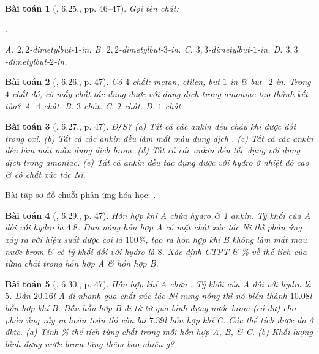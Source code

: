 \documentclass{article}
\newtheorem{baitoan}{Bài toán}
\begin{document}
\begin{baitoan}[\cite{SBT_Hoa_Hoc_11_co_ban}, 6.25., pp. 46--47]
	Gọi tên chất:
	\begin{center}
		.
	\end{center}
	{\sf A.} $2,2$-đimetylbut-$1$-in. {\sf B.} $2,2$-đimetylbut-$3$-in. {\sf C.} $3,3$-đimetylbut-$1$-in. {\sf D.} $3,3$-đimetylbut-$2$-in.
\end{baitoan}

\begin{baitoan}[\cite{SBT_Hoa_Hoc_11_co_ban}, 6.26., p. 47]
	Có $4$ chất: metan, etilen, but-$1$-in \& but$-2$-in. Trong $4$ chất đó, có mấy chất tác dụng được với dung dịch \emph{} trong amoniac tạo thành kết tủa? {\sf A.} $4$ chất. {\sf B.} $3$ chất. {\sf C.} $2$ chất. {\sf D.} $1$ chất.
\end{baitoan}

\begin{baitoan}[\cite{SBT_Hoa_Hoc_11_co_ban}, 6.27., p. 47]
	\emph{Đ\texttt{/}S?} (a) Tất cả các ankin đều cháy khi được đốt trong oxi. (b) Tất cả các ankin đều làm mất màu dung dịch \emph{}. (c) Tất cả các ankin đều làm mất màu dung dịch brom. (d) Tất cả các ankin đều tác dụng với dung dịch \emph{} trong amoniac. (e) Tất cả ankin đều tác dụng được với hydro ở nhiệt độ cao \& có chất xúc tác \emph{Ni}.
\end{baitoan}
Bài tập sơ đồ chuỗi phản ứng hóa học: \cite[6.28., p. 47]{SBT_Hoa_Hoc_11_co_ban}.

\begin{baitoan}[\cite{SBT_Hoa_Hoc_11_co_ban}, 6.29., p. 47]
	Hỗn hợp khí A chứa hydro \& 1 ankin. Tỷ khối của A đối với hydro là $4.8$. Đun nóng hỗn hợp A có mặt chất xúc tác \emph{Ni} thì phản ứng xảy ra với hiệu suất được coi là $100$\%, tạo ra hỗn hợp khí B không làm mất màu nước brom \& có tỷ khối đối với hydro là $8$. Xác định CTPT \& \% về thể tích của từng chất trong hỗn hợp A \& hỗn hợp B.
\end{baitoan}

\begin{baitoan}[\cite{SBT_Hoa_Hoc_11_co_ban}, 6.30., p. 47]
	Hỗn hợp khí A chứa \emph{}. Tỷ khối của A đối với hydro là $5$. Dẫn $20.16$\emph{l} A đi nhanh qua chất xúc tác \emph{Ni} nung nóng thì nó biến thành $10.08$\emph{l} hỗn hợp khí B. Dẫn hỗn hợp B đi từ từ qua bình đựng nước brom (có dư) cho phản ứng xảy ra hoàn toàn thì còn lại $7.39$\emph{l} hỗn hợp khí C. Các thể tích được đo ở đktc. (a) Tính \% thể tích từng chất trong mỗi hỗn hợp A, B, \& C. (b) Khối lượng bình đựng nước brom tăng thêm bao nhiêu \emph{g}?
\end{baitoan}
\end{document}
